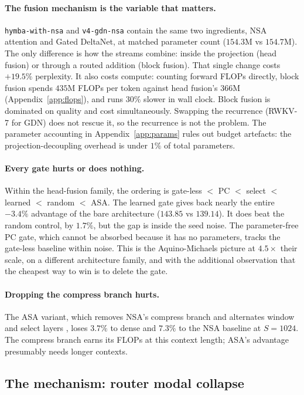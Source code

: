 \documentclass[11pt,a4paper]{article}
\begin{document}
\paragraph{The fusion mechanism is the variable that matters.}
\texttt{hymba-with-nsa} and \texttt{v4-gdn-nsa} contain the same two
ingredients, NSA attention and Gated DeltaNet, at matched parameter count
($154.3$M vs $154.7$M). The only difference is how the streams combine:
inside the projection (head fusion) or through a routed addition (block
fusion). That single change costs $+19.5\%$ perplexity. It also costs
compute: counting forward FLOPs directly, block fusion spends $435$M
FLOPs per token against head fusion's $366$M (Appendix~\ref{app:flops}),
and runs $30\%$ slower in wall clock. Block fusion is dominated on
quality and cost simultaneously. Swapping the recurrence (RWKV-7 for
GDN) does not rescue it, so the recurrence is not the problem. The
parameter accounting in Appendix~\ref{app:params} rules out budget
artefacts: the projection-decoupling overhead is under $1\%$ of total
parameters.

\paragraph{Every gate hurts or does nothing.} Within the head-fusion
family, the ordering is gate-less $<$ PC $<$ select $<$ learned $<$
random $<$ ASA. The learned gate gives back nearly the entire
$-3.4\%$ advantage of the bare architecture ($143.85$ vs $139.14$). It
does beat the random control, by $1.7\%$, but the gap is inside the seed
noise. The parameter-free PC gate, which cannot be absorbed because it
has no parameters, tracks the gate-less baseline within noise. This is
the Aquino-Michaels picture at $4.5\times$ their scale, on a different
architecture family, and with the additional observation that the
cheapest way to win is to delete the gate.

\paragraph{Dropping the compress branch hurts.} The ASA variant, which
removes NSA's compress branch and alternates window and select layers
\citep{asa}, loses $3.7\%$ to dense and $7.3\%$ to the NSA baseline at
$S{=}1024$. The compress branch earns its FLOPs at this context length;
ASA's advantage presumably needs longer contexts.

\subsection{The mechanism: router modal collapse}
\label{sec:h1}
\end{document}
